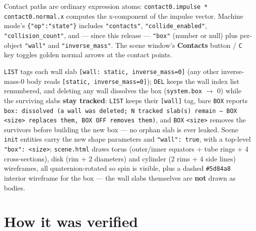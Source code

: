 \documentclass[11pt]{article}
\newcommand{\kw}[1]{\texttt{\uppercase{#1}}}
\newcommand{\code}[1]{\texttt{#1}}
\begin{document}
Contact paths are ordinary expression atoms:
\code{contact0.impulse * contact0.normal.x} computes the x-component of the
impulse vector. Machine mode's \code{\{"op":"state"\}} includes
\code{"contacts"}, \code{"collide\_enabled"}, \code{"collision\_count"}, and
--- since this release --- \code{"box"} (number or null) plus per-object
\code{"wall"} and \code{"inverse\_mass"}. The scene window's
\textbf{Contacts} button / \code{C} key toggles golden normal arrows at the
contact points.

\kw{list} tags each wall slab \code{[wall: static, inverse\_mass=0]} (any
other inverse-mass-0 body reads \code{[static, inverse\_mass=0]}); \kw{del}
keeps the wall index list renumbered, and deleting any wall dissolves the
box (\code{system.box} $\to$ 0) while the surviving slabs \textbf{stay
tracked}: \kw{list} keeps their \code{[wall]} tag, bare \kw{box} reports
\code{box: dissolved (a wall was deleted; N tracked slab(s) remain ---
BOX <size> replaces them, BOX OFF removes them)}, and \kw{box}
\code{<size>} removes the survivors before building the new box --- no
orphan slab is ever leaked. Scene \code{init} entities carry the
new shape parameters and \code{"wall": true}, with a top-level
\code{"box": <size>}; \code{scene.html} draws torus (outer/inner equators +
tube rings + 4 cross-sections), disk (rim + 2 diameters) and cylinder
(2 rims + 4 side lines) wireframes, all quaternion-rotated so spin is
visible, plus a dashed \code{\#5d84a8} interior wireframe for the box ---
the wall slabs themselves are \textbf{not} drawn as bodies.

\section{How it was verified}
\end{document}
